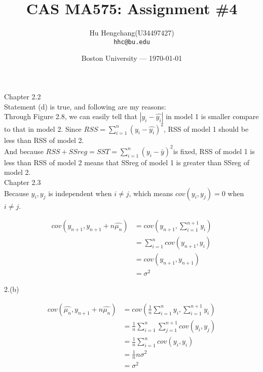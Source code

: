 \documentclass[fleqn]{article}
\title{CAS MA575: Assignment \#4} %
\author{Hu Hengchang(U34497427)\\ \texttt{hhc@bu.edu}} %
\date{Boston University --- \today} %
\begin{document}
\maketitle %




Chapter 2.2\\

Statement (d) is true, and following are my reasons:\\

Through Figure 2.8, we can easily tell that $|y_i - \hat{y_i}|$ in model 1 is smaller compare to that in model 2. Since $RSS = \sum_{i=1}^{n}(y_i - \hat{y_i})^2$, RSS of model 1 should be less than RSS of model 2.\\

And because $RSS + SSreg = SST = \sum_{i=1}^{n}(y_i - \bar{y})^2 $is fixed, RSS of model 1 is less than RSS of model 2 means that SSreg of model 1 is greater than SSreg of model 2.\\



Chapter 2.3\\

Because $y_i, y_j$ is independent when $i \neq j$, which means $cov(y_i, y_j) = 0$ when $i \neq j$.

\begin{equation*}
\begin{split}
cov(y_{n+1}, y_{n+1}+n\hat{\mu_n}) &= cov(y_{n+1}, \sum_{i=1}^{n+1}y_i)\\
&= \sum_{i=1}^{n}cov(y_{n+1}, y_i)\\
&= cov(y_{n+1}, y_{n+1})\\
&= \sigma^2
\end{split}
\end{equation*}

2.(b)

\begin{equation*}
\begin{split}
cov(\hat{\mu_n}, y_{n+1}+n\hat{\mu_n}) &= cov(\frac{1}{n}\sum_{i=1}^{n}y_i, \sum_{i=1}^{n+1}y_i)\\
&= \frac{1}{n}\sum_{i=1}^{n}\sum_{j=1}^{n+1}cov(y_i, y_j)\\
&= \frac{1}{n}\sum_{i=1}^{n}cov(y_i, y_i)\\
&= \frac{1}{n}n\sigma^2\\
&= \sigma^2
\end{split}
\end{equation*}\\
\end{document}
